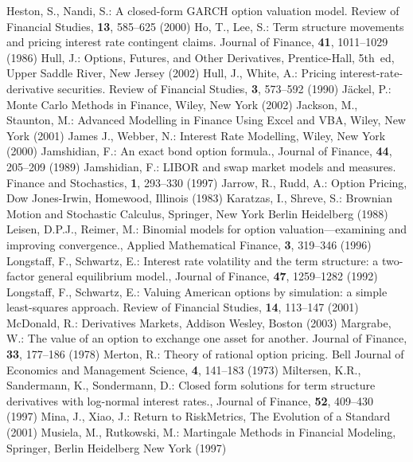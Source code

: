 \begin{thebibliography}{[KLR73]}
 Heston, S., Nandi, S.: A closed-form GARCH option valuation model. Review of Financial Studies, \textbf{13},  585--625 (2000)
 Ho, T., Lee, S.: Term structure movements and pricing interest rate contingent claims. Journal of Finance, \textbf{41},  1011--1029 (1986)
 Hull, J.: Options, Futures, and Other Derivatives,  Prentice-Hall, 5th~ed, Upper Saddle River, New Jersey (2002)
 Hull, J., White, A.: Pricing interest-rate-derivative securities. Review of Financial Studies, \textbf{3},  573--592 (1990)
J\"ackel, P.: Monte Carlo Methods in Finance, Wiley, New York (2002)
Jackson, M., Staunton, M.: Advanced Modelling in Finance Using Excel and VBA, Wiley, New York (2001)
James J., Webber, N.: Interest Rate Modelling, Wiley, New York (2000)
 Jamshidian, F.: An exact bond option formula., Journal of Finance, \textbf{44},  205--209 (1989)
 Jamshidian, F.: LIBOR and swap market models and measures. Finance and Stochastics, \textbf{1},  293--330 (1997)
Jarrow, R., Rudd, A.: Option Pricing, Dow Jones-Irwin, Homewood, Illinois (1983)
Karatzas, I., Shreve, S.: Brownian Motion and Stochastic Calculus, Springer, New York Berlin Heidelberg (1988)
 Leisen, D.P.J., Reimer, M.: Binomial models for option valuation---examining and improving convergence., Applied Mathematical Finance, \textbf{3},  319--346 (1996)
 Longstaff, F., Schwartz, E.: Interest rate volatility and the term structure:  a two-factor general equilibrium model., Journal of Finance, \textbf{47},  1259--1282 (1992)
 Longstaff, F., Schwartz, E.: Valuing American options by simulation:  a simple least-squares approach. Review of Financial Studies, \textbf{14},  113--147 (2001)
 McDonald, R.: Derivatives Markets, Addison Wesley, Boston (2003)
 Margrabe, W.: The value of an option to exchange one asset for another. Journal of Finance, \textbf{33},  177--186 (1978)
 Merton, R.: Theory of rational option pricing. Bell Journal of Economics and Management Science, \textbf{4},  141--183 (1973)
 Miltersen, K.R., Sandermann, K., Sondermann, D.: Closed form solutions for term structure derivatives with log-normal interest rates., Journal of Finance, \textbf{52},  409--430 (1997)
 Mina, J., Xiao, J.: Return to RiskMetrics,  The Evolution of a Standard (2001)
 Musiela, M., Rutkowski, M.: Martingale Methods in Financial Modeling, Springer, Berlin Heidelberg New York (1997)

\end{thebibliography}
